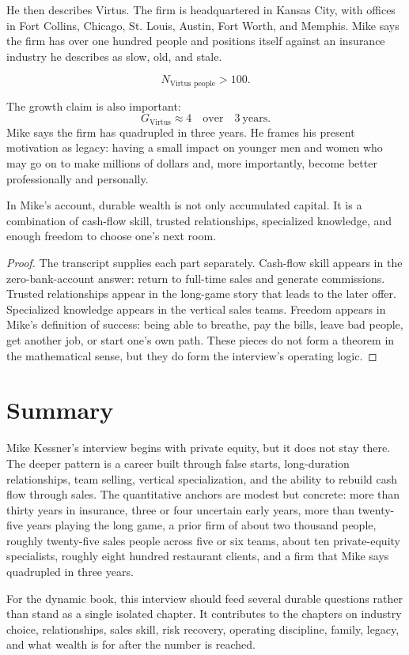 He then describes Virtus. The firm is headquartered in Kansas City, with offices in Fort Collins, Chicago, St. Louis, Austin, Fort Worth, and Memphis. Mike says the firm has over one hundred people and positions itself against an insurance industry he describes as slow, old, and stale.

\begin{equation}
N_{\text{Virtus people}} > 100.
\end{equation}

The growth claim is also important:
\begin{equation}
G_{\text{Virtus}} \approx 4 \quad \text{over} \quad 3\ \text{years}.
\end{equation}
Mike says the firm has quadrupled in three years. He frames his present motivation as legacy: having a small impact on younger men and women who may go on to make millions of dollars and, more importantly, become better professionally and personally.

\begin{proposition}
In Mike's account, durable wealth is not only accumulated capital. It is a combination of cash-flow skill, trusted relationships, specialized knowledge, and enough freedom to choose one's next room.
\end{proposition}

\begin{proof}
The transcript supplies each part separately. Cash-flow skill appears in the zero-bank-account answer: return to full-time sales and generate commissions. Trusted relationships appear in the long-game story that leads to the later offer. Specialized knowledge appears in the vertical sales teams. Freedom appears in Mike's definition of success: being able to breathe, pay the bills, leave bad people, get another job, or start one's own path. These pieces do not form a theorem in the mathematical sense, but they do form the interview's operating logic.
\end{proof}

\section{Summary}

Mike Kessner's interview begins with private equity, but it does not stay there. The deeper pattern is a career built through false starts, long-duration relationships, team selling, vertical specialization, and the ability to rebuild cash flow through sales. The quantitative anchors are modest but concrete: more than thirty years in insurance, three or four uncertain early years, more than twenty-five years playing the long game, a prior firm of about two thousand people, roughly twenty-five sales people across five or six teams, about ten private-equity specialists, roughly eight hundred restaurant clients, and a firm that Mike says quadrupled in three years.

For the dynamic book, this interview should feed several durable questions rather than stand as a single isolated chapter. It contributes to the chapters on industry choice, relationships, sales skill, risk recovery, operating discipline, family, legacy, and what wealth is for after the number is reached.